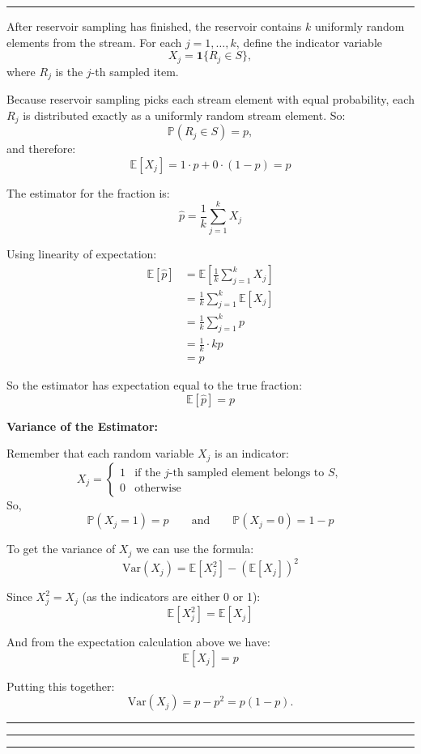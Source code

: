 \documentclass[11pt, english]{article}
\newenvironment{answer}{%
  \par\noindent\hrule %
  \vspace{0.25\baselineskip}%
  \noindent{\Large\bfseries Answer}\par\vspace{0.25\baselineskip}\noindent\ignorespaces
}{%
  \par\vspace{0.5\baselineskip}%
  \noindent\hrule\vspace{0.5\baselineskip}%
  \hrule\hrule
}
\begin{document}
\begin{answer}
After reservoir sampling has finished, the reservoir contains
$k$ uniformly random elements from the stream.  
For each $j = 1, \ldots, k$, define the indicator variable
\[
    X_j = \mathbf{1}\{ R_j \in S \},
\]
where $R_j$ is the $j$-th sampled item.

Because reservoir sampling picks each stream element with equal probability,
each $R_j$ is distributed exactly as a uniformly random stream element.
So:
\[
    \mathbb{P}(R_j \in S) = p,
\]
and therefore:
\[
    \mathbb{E}[X_j] = 1 \cdot p + 0 \cdot (1-p) = p
\]

The estimator for the fraction is:
\[
    \widehat{p}
    = \frac{1}{k} \sum_{j=1}^k X_j
\]

Using linearity of expectation:
\begin{align*}
    \mathbb{E}[\widehat{p}]
    &= 
    \mathbb{E}\!\left[ \frac{1}{k} \sum_{j=1}^k X_j \right] \\[6pt]
    &= 
    \frac{1}{k} \sum_{j=1}^k \mathbb{E}[X_j] \\[6pt]
    &= 
    \frac{1}{k} \sum_{j=1}^k p \\[6pt]
    &= 
    \frac{1}{k} \cdot k p \\[6pt]
    &= p
\end{align*}

So the estimator has expectation equal to the true fraction:
\[
    \mathbb{E}[\widehat{p}] = p
\]

\bigskip

\textbf{Variance of the Estimator:}

Remember that each random variable $X_j$ is an indicator:
\[
    X_j =
    \begin{cases}
        1 & \text{if the $j$-th sampled element belongs to } S, \\
        0 & \text{otherwise}
    \end{cases}
\]
So,
\[
    \mathbb{P}(X_j = 1) = p
    \qquad\text{and}\qquad
    \mathbb{P}(X_j = 0) = 1 - p
\]

To get the variance of $X_j$ we can use the formula:
\[
    \mathrm{Var}(X_j)
    = \mathbb{E}[X_j^2] - (\mathbb{E}[X_j])^2
\]

Since $X_j^2 = X_j$ (as the indicators are either 0 or 1):
\[
    \mathbb{E}[X_j^2]
    = \mathbb{E}[X_j]
\]

And from the expectation calculation above we have:
\[
    \mathbb{E}[X_j] = p
\]

Putting this together:
\[
    \mathrm{Var}(X_j)
    = p - p^2
    = p(1-p).
\]


\end{answer}
\end{document}
